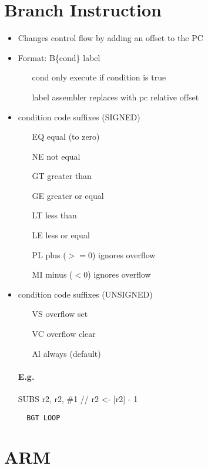 \documentclass[12pt]{report}
\begin{document}
\section{Branch Instruction}
  \begin{itemize}
    \item Changes control flow by adding an offset to the PC
    \item Format: B\{cond\} label
    \begin{itemize}
      \item[cond] only execute if condition is true
      \item[label] assembler replaces with pc relative offset
    \end{itemize}
    \item condition code suffixes (SIGNED)
    \begin{itemize}
      \item[EQ] equal (to zero)
      \item[NE] not equal
      \item[GT] greater than
      \item[GE] greater or equal
      \item[LT] less than
      \item[LE] less or equal
      \item[PL] plus ($>= 0$) ignores overflow
      \item[MI] minus ($<0$) ignores overflow
    \end{itemize}
    \item condition code suffixes (UNSIGNED)
    \begin{itemize}
      \item[VS] overflow set
      \item[VC] overflow clear
      \item[Al] always (default)
    \end{itemize}

    \paragraph{E.g.} SUBS r2, r2, \#1 // r2 <- [r2] - 1
    \begin{lstlisting}
  BGT LOOP
    \end{lstlisting}
  \end{itemize}


\section{ARM}
\end{document}
